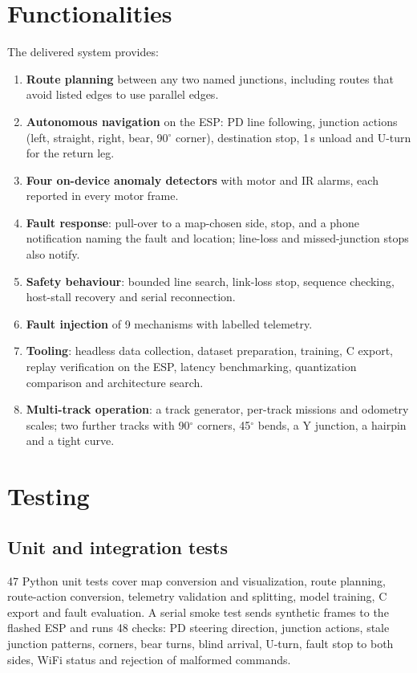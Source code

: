 \documentclass[conference]{IEEEtran}
\begin{document}
\section{Functionalities}
The delivered system provides:
\begin{enumerate}
\item \textbf{Route planning} between any two named junctions, including routes
  that avoid listed edges to use parallel edges.
\item \textbf{Autonomous navigation} on the ESP: PD line following, junction
  actions (left, straight, right, bear, 90$^\circ$ corner), destination stop,
  1\,s unload and U-turn for the return leg.
\item \textbf{Four on-device anomaly detectors} with motor and IR alarms, each
  reported in every motor frame.
\item \textbf{Fault response}: pull-over to a map-chosen side, stop, and a
  phone notification naming the fault and location; line-loss and
  missed-junction stops also notify.
\item \textbf{Safety behaviour}: bounded line search, link-loss stop, sequence
  checking, host-stall recovery and serial reconnection.
\item \textbf{Fault injection} of 9 mechanisms with labelled telemetry.
\item \textbf{Tooling}: headless data collection, dataset preparation, training,
  C export, replay verification on the ESP, latency benchmarking, quantization
  comparison and architecture search.
\item \textbf{Multi-track operation}: a track generator, per-track missions and
  odometry scales; two further tracks with 90$^\circ$ corners, 45$^\circ$ bends,
  a Y junction, a hairpin and a tight curve.
\end{enumerate}

\section{Testing}

\subsection{Unit and integration tests}
47 Python unit tests cover map conversion and visualization, route planning,
route-action conversion, telemetry validation and splitting, model training,
C export and fault evaluation. A serial smoke test sends synthetic frames to the
flashed ESP and runs 48 checks: PD steering direction, junction actions, stale
junction patterns, corners, bear turns, blind arrival, U-turn, fault stop to both
sides, WiFi status and rejection of malformed commands.
\end{document}
